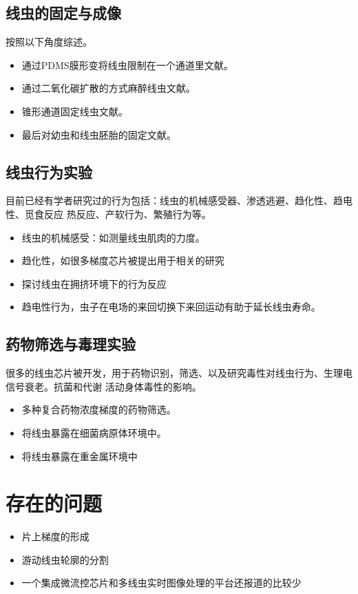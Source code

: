 \subsection{线虫的固定与成像}
\label{sec:intro:analog}
	按照以下角度综述。
	\begin{itemize}
	  \item 通过PDMS膜形变将线虫限制在一个通道里文献。
	  \item 通过二氧化碳扩散的方式麻醉线虫文献。
	  \item 锥形通道固定线虫文献。
	  \item 最后对幼虫和线虫胚胎的固定文献。
	\end{itemize}

\subsection{线虫行为实验}
\label{sec:intro:analog}
	目前已经有学者研究过的行为包括：线虫的机械感受器、渗透逃避、趋化性、趋电性、觅食反应
热反应、产软行为、繁殖行为等。
	\begin{itemize}
	  \item 线虫的机械感受：如测量线虫肌肉的力度。
	  \item 趋化性，如很多梯度芯片被提出用于相关的研究
	  \item 探讨线虫在拥挤环境下的行为反应
	  \item 趋电性行为，虫子在电场的来回切换下来回运动有助于延长线虫寿命。
	\end{itemize}
\subsection{药物筛选与毒理实验}
\label{sec:intro:analog}
	很多的线虫芯片被开发，用于药物识别，筛选、以及研究毒性对线虫行为、生理电信号衰老。抗菌和代谢
活动身体毒性的影响。
	\begin{itemize}
	  \item 多种复合药物浓度梯度的药物筛选。
	  \item 将线虫暴露在细菌病原体环境中。
	  \item 将线虫暴露在重金属环境中
	\end{itemize}

\section{存在的问题}
\label{sec:intro:analog}
	\begin{itemize}
	  \item 片上梯度的形成
	  \item 游动线虫轮廓的分割
	  \item 一个集成微流控芯片和多线虫实时图像处理的平台还报道的比较少
	\end{itemize}
